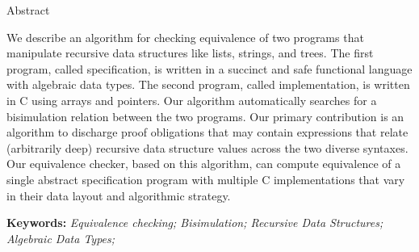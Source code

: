 \begin{center}

\LARGE{Abstract}
\end{center}
We describe an algorithm for checking equivalence of two
programs that manipulate recursive data structures like
lists, strings, and trees.  The first program, called
specification,
is written in a succinct and
safe functional language with algebraic data types.
The second program, called implementation,
is written in C using arrays and pointers.
Our algorithm automatically searches for a bisimulation
relation between the two programs. Our
primary contribution is an algorithm to discharge proof
obligations that may contain expressions that relate
(arbitrarily deep) recursive data structure values across the two
diverse syntaxes. Our equivalence checker, based on this algorithm,
can compute equivalence
of a single abstract specification program with multiple
C implementations that vary in their data layout and
algorithmic strategy.

\textbf{Keywords:} \textit{Equivalence checking; Bisimulation; Recursive Data Structures; Algebraic Data Types;}

\setlength{\parindent}{1.0em}
